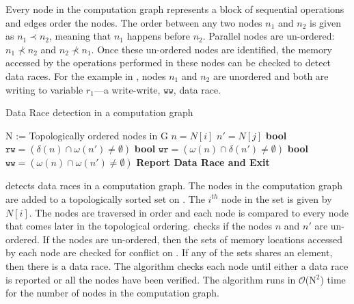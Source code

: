 Every node in the computation graph represents a block of sequential operations and edges order the nodes. The order between any two nodes $n_1$ and $n_2$ is given as $n_1 \prec n_2$, meaning that $n_1$ happens before $n_2$. Parallel nodes are un-ordered: $n_1 \nprec n_2$ and $n_2 \nprec n_1$. Once these un-ordered nodes are identified, the memory accessed by the operations performed in these nodes  can be checked to detect data races.  For the example in , nodes $n_1$ and $n_2$ are unordered and both are writing to variable $r_1$---a write-write, $\mathtt{ww}$, data race.

\begin{algorithm}
\caption{Data Race detection in a computation graph } \label{algo:drd}
\begin{algorithmic}[1]
\State N := Topologically ordered nodes in G \label{loc:topo}
\State $n = N[i]$
\State $n' = N[j]$
  \label{loc:path} \label{loc:forall}
	\State \textbf{bool} $\mathtt{rw} = (\delta(n) \cap \omega(n') \neq \emptyset) $
	\State \textbf{bool} $\mathtt{wr} = (\omega(n) \cap \delta(n') \neq \emptyset) $
	\State \textbf{bool} $\mathtt{ww} = (\omega(n) \cap \omega(n') \neq \emptyset)$
		 \label{loc:intersection}
			\State \textbf{Report Data Race and Exit} \label{loc:datarace}
		\EndIf
\EndIf
 \EndFor
 \EndFor
\EndFunction  
\end{algorithmic}
\end{algorithm}

 detects data races in a computation graph. The nodes in the computation graph are added to a topologically sorted set on . The $i^{th}$ node in the set is given by $N[i]$. The nodes are traversed in order and each node is compared to every node that comes later in the topological ordering.  checks if the nodes $n$ and $n'$ are un-ordered. If the nodes are un-ordered, then the sets of memory locations accessed by each node are checked for conflict on . If any of the sets shares an element, then there is a data race. The algorithm checks each node until either a data race is reported or all the nodes have been verified. The algorithm runs in $\mathcal{O}$(N$^2$) time for the number of nodes in the computation graph.

